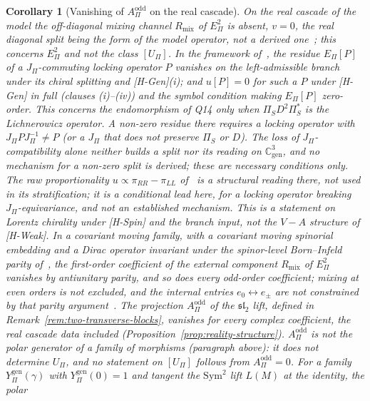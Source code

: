 \documentclass[11pt]{article}
\newtheorem{corollary}{Corollary}
\theoremstyle{definition}
\theoremstyle{remark}
\newcommand{\JPi}{J_{\Pi}}
\newcommand{\Cgen}{\mathbb{C}^{3}_{\mathrm{gen}}}
\newcommand{\Epi}{E_{\Pi}}
\newcommand{\Ygen}{{Y^{\mathrm{gen}}_{\Pi}}}
\newcommand{\Upi}{U_{\Pi}}
\newcommand{\Aodd}{A_{\Pi}^{\mathrm{odd}}}
\newcommand{\Sym}{\mathrm{Sym}}
\begin{document}
    \begin{corollary}[Vanishing of $\Aodd$ on the real cascade]
      \label{cor:real-cascade-collapse}
      On the real cascade of the model the off-diagonal mixing channel $R_{\mathrm{mix}}$ of $\Epi^{2}$ is absent,
      $v = 0$, the real diagonal split being the form of the model operator, not a derived one~\cite{Beau2026prs}; this concerns
      $\Epi^{2}$ and not the class $[\Upi]$.
      In the framework of~\cite{Beau2026prs}, the residue $\Epi[P]$ of a $\JPi$-commuting locking operator $P$
      vanishes on the left-admissible branch under its chiral splitting and [H-Gen](i); and $u[P] = 0$ for such a
      $P$ under [H-Gen] in full (clauses (i)--(iv)) and the symbol condition making $\Epi[P]$ zero-order.
      This concerns the endomorphism of Q14 only when $\Pi_{S} D^{2} \Pi_{S}^{*}$ is the Lichnerowicz operator.
      A non-zero residue there requires a locking
      operator with $\JPi P \JPi^{-1} \neq P$ (or a $\JPi$ that does not preserve $\Pi_{S}$ or $D$).
      The loss of $\JPi$-compatibility alone neither builds a split nor its reading on $\Cgen$, and no mechanism
      for a non-zero split is derived; these are necessary conditions only.
      The raw proportionality $u \propto \pi_{RR} - \pi_{LL}$ of~\cite{Beau2026prs} is a structural reading there,
      not used in its stratification; it is a conditional lead here, for a locking operator breaking
      $\JPi$-equivariance, and not an established mechanism.
      This is a statement on Lorentz chirality under [H-Spin] and the branch input, not the $V{-}A$ structure of
      [H-Weak].
      In a covariant moving family, with a covariant moving spinorial embedding and a Dirac operator invariant under
      the spinor-level Born--Infeld parity of~\cite{Beau2026ebj}, the
      first-order coefficient of the external component $R_{\mathrm{mix}}$ of $\Epi^{2}$ vanishes by antiunitary
      parity, and so does every odd-order coefficient; mixing at even orders is not excluded, and the internal entries
      $e_{0} \leftrightarrow e_{\pm}$ are not constrained by that parity argument~\cite{Beau2026ebj}.
      The projection $\Aodd$ of the $\mathfrak{sl}_{2}$ lift, defined in Remark~\ref{rem:two-transverse-blocks},
      vanishes for every complex coefficient, the real cascade data included
      (Proposition~\ref{prop:reality-structure}).
      $\Aodd$ is not the polar generator of a family of morphisms (paragraph above): it does not determine $\Upi$,
      and no statement on $[\Upi]$ follows from $\Aodd = 0$.
      For a family $\Ygen(\gamma)$ with $\Ygen(0) = 1$ and tangent the $\Sym^{2}$ lift $L(M)$ at the identity, the polar

\end{corollary}
\end{document}
